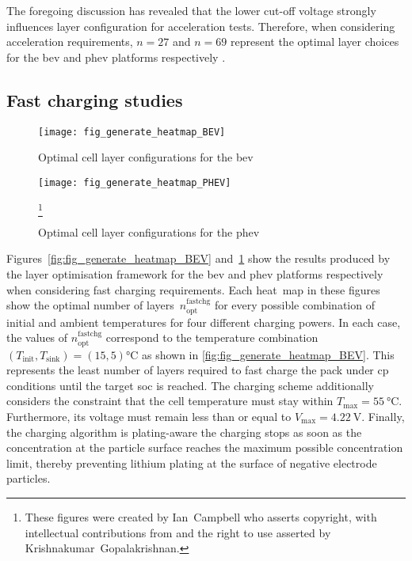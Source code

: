 The foregoing  discussion has revealed  that the lower cut-off  voltage strongly
influences  layer   configuration  for   acceleration  tests.   Therefore,  when
considering acceleration requirements, $n = 27$ and $n=69$ represent the optimal
layer choices for the \gls{bev} and \gls{phev} platforms respectively .

\subsection{Fast charging studies}

\begin{figure}[p]
    \begin{minipage}[t]{\textwidth}
        \centering
        \texttt{[image: fig\_generate\_heatmap\_BEV]}
        \captionsetup{labelsep=note}
        \caption[Optimal cell layer configurations for the \gls{bev}, presented for a range of fast charging powers and thermal conditions]{Optimal cell layer configurations for the \gls{bev}}
        \label{fig:fig_generate_heatmap_BEV}
        \setcounter{footnote}{8}
        \vspace*{\floatsep}
        \texttt{[image: fig\_generate\_heatmap\_PHEV]}
        \caption[Optimal cell layer configurations for the \gls{phev}, presented for a range of
        fast charging powers and thermal conditions]{Optimal cell layer configurations for the \gls{phev}}
        \label{fig:fig_generate_heatmap_PHEV}
        \mpfootnotes[1]
        \footnote{These figures were created by \mbox{Ian Campbell} who asserts copyright,
            with intellectual contributions from and the right to use asserted by
        \mbox{Krishnakumar Gopalakrishnan}.}
    \end{minipage}
\end{figure}

Figures~\ref{fig:fig_generate_heatmap_BEV}
and~\ref{fig:fig_generate_heatmap_PHEV} show  the results produced by  the layer
optimisation framework  for the \gls{bev} and  \gls{phev} platforms respectively
when considering fast charging requirements. Each heat~map in these figures show
the optimal  number of  layers~$n^\text{fastchg}_\text{opt}$ for  every possible
combination  of initial  and ambient  temperatures for  four different  charging
powers. In each case, the  values of $n^\text{fastchg}_\text{opt}$ correspond to
the  temperature  combination  \mbox{$(T_\text{init},T_\text{sink})  =  (15,  5)
\si{\degreeCelsius}$}  as  shown  in  \cref{fig:fig_generate_heatmap_BEV}.  This
represents the  least number of  layers required to  fast charge the  pack under
\gls{cp} conditions until  the target \gls{soc} is reached.  The charging scheme
additionally considers the constraint that the cell temperature must stay within
\mbox{$T_\text{max}=  \SI{55}{\degreeCelsius}$}. Furthermore,  its voltage  must
remain less than or equal  to \mbox{$V_\text{max} = \SI{4.22}{\volt}$}. Finally,
the charging algorithm is plating-aware \ie{}  the charging stops as soon as the
concentration at the particle surface reaches the maximum possible concentration
limit, thereby preventing  lithium plating at the surface  of negative electrode
particles.


